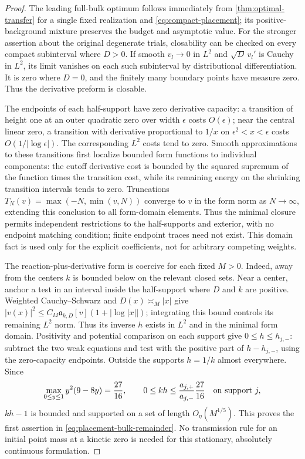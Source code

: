\begin{proof}
The leading full-bulk optimum follows immediately from
\cref{thm:optimal-transfer} for a single fixed realization and
\eqref{eq:compact-placement}; its positive-background mixture
preserves the budget and asymptotic value.
For the stronger assertion about the original degenerate trials,
closability can be checked on every compact subinterval where $D>0$.
If smooth $v_l\to0$ in $L^2$ and $\sqrt D\,v_l'$ is Cauchy in $L^2$,
its limit vanishes on each such subinterval by distributional
differentiation. It is zero where $D=0$, and the finitely many boundary
points have measure zero. Thus the derivative preform is closable.

The endpoints of each half-support have zero derivative capacity:
a transition of height one at an outer quadratic zero over width
$\epsilon$ costs $O(\epsilon)$; near the central linear zero, a
transition with derivative proportional to $1/x$ on
$\epsilon^2<x<\epsilon$ costs $O(1/|\log\epsilon|)$.
The corresponding $L^2$ costs tend to zero. Smooth approximations to
these transitions first localize bounded form functions to individual
components: the cutoff derivative cost is bounded by the squared
supremum of the function times the transition cost, while its remaining
energy on the shrinking transition intervals tends to zero.
Truncations $T_N(v)=\max(-N,\min(v,N))$ converge to $v$ in the form
norm as $N\to\infty$, extending this conclusion to all form-domain
elements. Thus the minimal closure permits independent restrictions
to the half-supports and exterior, with no endpoint matching condition;
finite endpoint traces need not exist. This domain fact is used only
for the explicit coefficients, not for arbitrary competing weights.

The reaction-plus-derivative form is coercive for each fixed $M>0$.
Indeed, away from the centers $k$ is bounded below on the relevant
closed sets. Near a center, anchor a test in an interval inside the
half-support where $D$ and $k$ are positive. Weighted Cauchy--Schwarz
and $D(x)\asymp_M |x|$ give
$|v(x)|^2\le C_M\mathfrak a_{k,D}[v](1+|\log |x||)$;
integrating this bound controls its remaining $L^2$ norm.
Thus its inverse $h$ exists in $L^2$ and in the minimal form domain.
Positivity and potential comparison on each support give
$0\le h\le h_{j,-}$: subtract the two weak equations and test with
the positive part of $h-h_{j,-}$, using the zero-capacity endpoints.
Outside the supports $h=1/k$ almost everywhere. Since
\[
 \max_{0\le y\le1}y^2(9-8y)=\frac{27}{16},
 \qquad
 0\le kh\le\frac{a_{j,+}}{a_{j,-}}\frac{27}{16}
 \quad\hbox{on support }j,
\]
$kh-1$ is bounded and supported on a set of length $O_\eta(M^{1/5})$.
This proves the first assertion in \eqref{eq:placement-bulk-remainder}.
No transmission rule for an initial point mass at a kinetic zero is
needed for this stationary, absolutely continuous formulation.


\end{proof}
